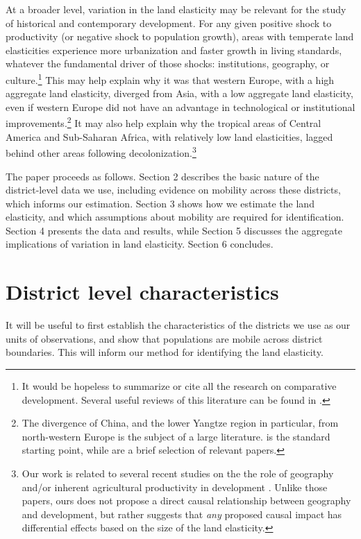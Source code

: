 \documentclass[11pt]{article}
\begin{document}
At a broader level, variation in the land elasticity may be relevant for the study of historical and contemporary development. For any given positive shock to productivity (or negative shock to population growth), areas with temperate land elasticities experience more urbanization and faster growth in living standards, whatever the fundamental driver of those shocks: institutions, geography, or culture.\footnote{It would be hopeless to summarize or cite all the research on comparative development. Several useful reviews of this literature can be found in \cite{ajr2005handbook,nunn_2009,Galor:2011uq,sw2013,vries2013}.} This may help explain why it was that western Europe, with a high aggregate land elasticity, diverged from Asia, with a low aggregate land elasticity, even if western Europe did not have an advantage in technological or institutional improvements.\footnote{The divergence of China, and the lower Yangtze region in particular, from north-western Europe is the subject of a large literature. \citet{pom2000} is the standard starting point, while \citet{allen11,huang2002,ma2013,lee2002,bg2006} are a brief selection of relevant papers.} It may also help explain why the tropical areas of Central America and Sub-Saharan Africa, with relatively low land elasticities, lagged behind other areas following decolonization.\footnote{Our work is related to several recent studies on the the role of geography and/or inherent agricultural productivity in development \citep{oh2005,ashraf2010dynamics,Nunn2011,Nunn2012,mich2012,agn2013,cook14,cook2014role,fenske2014,alsan2015,ashrafmich2015,dks2015,galorozak2016,litina2016,ads2016,FrankemaPap2017}. Unlike those papers, ours does not propose a direct causal relationship between geography and development, but rather suggests that \textit{any} proposed causal impact has differential effects based on the size of the land elasticity.} 

The paper proceeds as follows. Section 2 describes the basic nature of the district-level data we use, including evidence on mobility across these districts, which informs our estimation. Section 3 shows how we estimate the land elasticity, and which assumptions about mobility are required for identification. Section 4 presents the data and results, while Section 5 discusses the aggregate implications of variation in land elasticity. Section 6 concludes.

\section{District level characteristics}
It will be useful to first establish the characteristics of the districts we use as our units of observations, and show that populations are mobile across district boundaries. This will inform our method for identifying the land elasticity.
\end{document}
